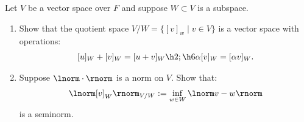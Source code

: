 \documentclass[11pt,twoside,openany]{memoir}
\begin{document}
    \begin{exercise}
        Let $V$ be a vector space over $F$ and suppose $W \subset V$ is a subspace.
        \begin{enumerate}[label = (\arabic*),itemsep=1pt,topsep=3pt]
            \item Show that the quotient space $V/W = \{[v]_w \mid v \in V\}$ is a vector space with operations:
                \begin{equation*}
                \begin{split}
                    [u]_W + [v]_W = [u + v]_W \h2 ; \h6 \alpha[v]_W = [\alpha v]_W.
                \end{split}
                \end{equation*}
            \item Suppose $\lnorm \cdot \rnorm$ is a norm on $V$. Show that:
            \begin{equation*}
            \begin{split}
                \lnorm [v]_W \rnorm_{V/W} := \inf_{w \in W}\lnorm v - w \rnorm
            \end{split}
            \end{equation*}
        is a seminorm.
        \end{enumerate}
    \end{exercise}
\end{document}
